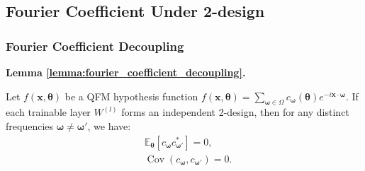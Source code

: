 \documentclass[%
 reprint,
 amsmath,amssymb,
 aps,
 pra,
]{revtex4-2}
\theoremstyle{definition}
\newenvironment{restate}[2]{%
  \par\noindent\textbf{#1 \ref{#2}. }\itshape%
}{\par\medskip}
\begin{document}
\subsection{Fourier Coefficient Under 2-design}

\subsubsection{Fourier Coefficient Decoupling}
\label{app:fourier_coefficient_decoupling}

\begin{restate}{Lemma}{lemma:fourier_coefficient_decoupling}
Let \(f(\bm{x},\bm{\theta})\) be a QFM hypothesis function \(f(\boldsymbol{x},\boldsymbol{\theta})=\sum_{\boldsymbol{\omega}\in\Omega}
c_{\boldsymbol{\omega}}(\boldsymbol{\theta}) e^{-i\boldsymbol{x}\cdot\boldsymbol{\omega}}\). If each trainable layer \(W^{(l)}\) forms an independent 2-design, then for any distinct frequencies \(\bm{\omega} \neq \bm{\omega}'\), we have:
\begin{align}
&\mathbb{E}_{\bm{\theta}} [c_{\bm{\omega}} c_{\bm{\omega}'}^*] = 0,\\
&\operatorname{Cov}(c_{\bm{\omega}}, c_{\bm{\omega}'}) = 0.
\end{align}
\end{restate}
\end{document}
